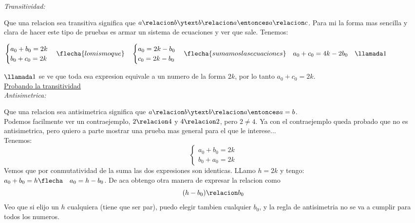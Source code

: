 \begin{enumerate}[label=\roman*)]
        \textit{Transitividad: }\par
        Que una relacion sea transitiva significa que $a \relacion b \ytext b \relacion a \entonces a \relacion c$. 
        Para mi la forma mas sencilla y clara de hacer este tipo de pruebas es armar un sistema de ecuaciones y ver
        que sale. Tenemos: \par
        $\begin{cases}
          a_0 + b_0 = 2k \\
          b_0 + c_0 = 2k
        \end{cases}
        \flecha{lo mismo que} \quad 
        \begin{cases}
          a_0 = 2k - b_0 \\
          c_0 = 2k - b_0
        \end{cases}
        \flecha{sumamos las ecuaciones} \quad
        a_0 + c_0 = 4k - 2b_0 \quad \llamada1
        $
        \par
        $\llamada1$ se ve que toda esa expresion equivale a un numero de la forma $2k$, por lo tanto $a_0 + c_0 = 2k$.\\
        \underline{Probando la transitividad}\\

        \textit{Antisimetrica: }\par
        Que una relacion sea antisimetrica significa que $a \relacion b \ytext b \relacion a \entonces a = b$. \\
        Podemos facilmente ver un contraejemplo, $2\relacion4$ y $4\relacion2$, pero $2\neq4$. 
        Ya con el contraejemplo queda probado que no es antisimetrica, pero quiero a parte mostrar una prueba mas general para 
        el que le interese...\\
        Tenemos:
        \[
        \begin{cases}
          a_0 + b_0 = 2k\\
          b_0 + a_0 = 2k
        \end{cases}
        \]
        Vemos que por conmutatividad de la suma las dos expresiones son identicas. LLamo $h = 2k$ y tengo: \\
        $a_0 + b_0 = h \flecha \quad a_0 = h - b_0$. De aca obtengo otra manera de expresar la relacion como
        \[
        (h - b_0) \relacion b_0
        \] 
        Veo que si elijo un $h$ cualquiera (tiene que ser par), puedo elegir tambien cualquier $b_0$, y la regla de 
        antisimetria no se va a cumplir para todos los numeros.
        


\end{enumerate}
